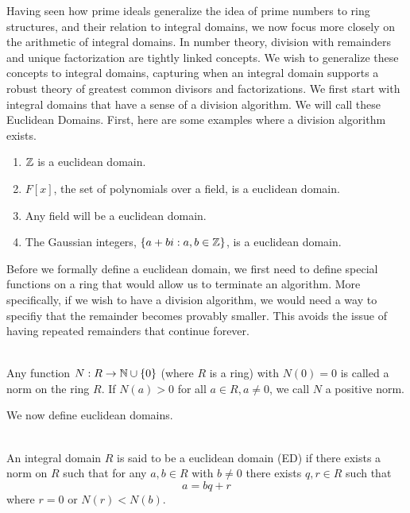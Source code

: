 \indent Having seen how prime ideals generalize the idea of prime numbers to ring structures, and their relation to integral domains, we now focus more closely on the arithmetic of integral domains. In number theory, division with remainders and unique factorization are tightly linked concepts. We wish to generalize these concepts to integral domains, capturing when an integral domain supports a robust theory of greatest common divisors and factorizations. \newline
\indent We first start with integral domains that have a sense of a division algorithm. We will call these Euclidean Domains. First, here are some examples where a division algorithm exists.

\begin{example}
    \begin{enumerate}
        \item $\mathbb{Z}$ is a euclidean domain.
        \item $F[x]$, the set of polynomials over a field, is a euclidean domain.
        \item Any field will be a euclidean domain.
        \item The Gaussian integers, $\left\{a+bi: a,b \in \mathbb{Z}\right\}$, is a euclidean domain.
    \end{enumerate}
\end{example}

Before we formally define a euclidean domain, we first need to define special functions on a ring that would allow us to terminate an algorithm. More specifically, if we wish to have a division algorithm, we would need a way to specifiy that the remainder becomes provably smaller. This avoids the issue of having repeated remainders that continue forever.

\begin{definition} \leavevmode \\
    Any function $N: R \to \mathbb{N} \cup \left\{0\right\}$ (where $R$ is a ring) with $N(0) = 0$ is called a norm on the ring $R$. If $N(a) > 0$ for all $a\in R, a \neq 0$, we call $N$ a positive norm.
\end{definition}

We now define euclidean domains.

\begin{definition} \leavevmode \\
    An integral domain $R$ is said to be a euclidean domain (ED) if there exists a norm on $R$ such that for any $a,b \in R$ with $b\neq 0$ there exists $q,r \in R$ such that
    $$a=bq +r$$
    where $r = 0$ or $N(r) < N(b)$.
\end{definition}

